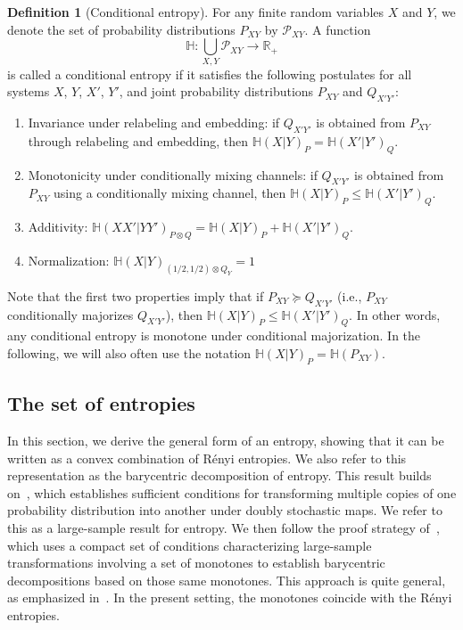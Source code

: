 \documentclass[aps,pra,11pt,onecolumn,nofootinbib,tightenlines]{revtex4-2}
\theoremstyle{definition}
\newtheorem{definition}[theorem]{Definition}
\renewcommand{\H}{\mathbb{H}}
\newcommand{\mc}[1]{\mathcal{#1}}
\begin{document}
\begin{definition}[Conditional entropy]
\label{def: conditional entropy}
For any finite random variables $X$ and $Y$, we denote the set of probability distributions $P_{XY}$ by $\mc P_{XY}$. A function
\begin{equation}
\H : \bigcup_{X, Y} \mc P_{XY} \rightarrow \mathbb{R}_+
\label{eq:cond-ent-gen-def-1st}
\end{equation}
is called a conditional entropy if it satisfies the following postulates for all systems $X$, $Y$, $X'$, $Y'$, and joint probability distributions $P_{XY}$ and $Q_{X'Y'}$:
\begin{enumerate}
    \item Invariance under relabeling and embedding: if $Q_{X'Y'}$ is obtained from $P_{XY}$ through relabeling and embedding, then $\H(X|Y)_P=\H(X'|Y')_Q$. 
 \label{eq:QCE-2nd-postulate-iso}
    \item Monotonicity under conditionally mixing channels: if $Q_{X'Y'}$ is obtained from $P_{XY}$ using a conditionally mixing channel, then $\H(X|Y)_P\leq\H(X'|Y')_Q.$ 
\label{eq:QCE-1st-postulate-mono} 
    \item Additivity: $\H(XX'|YY')_{P \otimes Q} = \H(X|Y)_{P} + \H(X'|Y')_{Q}$.
  \label{eq:QCE-3rd-postulate-add}
    \item Normalization: $\H(X|Y)_{(1/2,1/2) \otimes Q_Y} = 1$
     \label{eq:QCE-4-postulate-normalization}
\end{enumerate}
\end{definition}
Note that the first two properties imply that if \(P_{XY} \succeq Q_{X'Y'}\) (i.e., \(P_{XY}\) conditionally majorizes \(Q_{X'Y'}\)), then \(\H(X|Y)_P \leq \H(X'|Y')_Q\). In other words, any conditional entropy is monotone under conditional majorization. In the following, we will 
also often use the notation $\H(X|Y)_P=\H(P_{XY})$.

\subsection{The set of entropies}
\label{sec: set of entropies}
In this section, we derive the general form of an entropy, showing that it can be written as a convex combination of Rényi entropies. We also refer to this representation as the barycentric decomposition of entropy.
This result builds on~\cite[Proposition 3.7]{Jensen_Kjaerulf_2019}, which establishes sufficient conditions for transforming multiple copies of one probability distribution into another under doubly stochastic maps. We refer to this as a large-sample result for entropy. We then 
follow the proof strategy of~\cite[Theorem 2]{mu21_renyi}, which uses a compact set of conditions characterizing large-sample transformations involving a set of monotones to establish barycentric decompositions based on those same monotones. This approach is quite general, as emphasized in~\cite{haapasalo_inprep}. In the present setting, the monotones coincide with the Rényi entropies.
\end{document}
